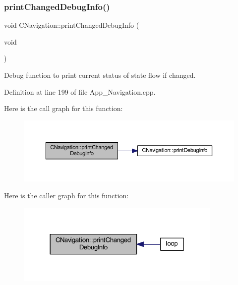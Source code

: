 \subsubsection{\texorpdfstring{print\+Changed\+Debug\+Info()}{printChangedDebugInfo()}}
{\footnotesize\ttfamily void C\+Navigation\+::print\+Changed\+Debug\+Info (\begin{DoxyParamCaption}\item[{void}]{ }\end{DoxyParamCaption})\hspace{0.3cm}{\ttfamily [virtual]}}



Debug function to print current status of state flow if changed. 



Definition at line 199 of file App\+\_\+\+Navigation.\+cpp.

Here is the call graph for this function\+:\nopagebreak
\begin{figure}[H]
\begin{center}
\leavevmode
\includegraphics[width=350pt]{class_c_navigation_ac491c77788ba2e953a704b6ad622a665_cgraph}
\end{center}
\end{figure}
Here is the caller graph for this function\+:\nopagebreak
\begin{figure}[H]
\begin{center}
\leavevmode
\includegraphics[width=282pt]{class_c_navigation_ac491c77788ba2e953a704b6ad622a665_icgraph}
\end{center}
\end{figure}
\mbox{\label{class_c_navigation_a84e320cd8975593ab6f966e8794b2886}} 
